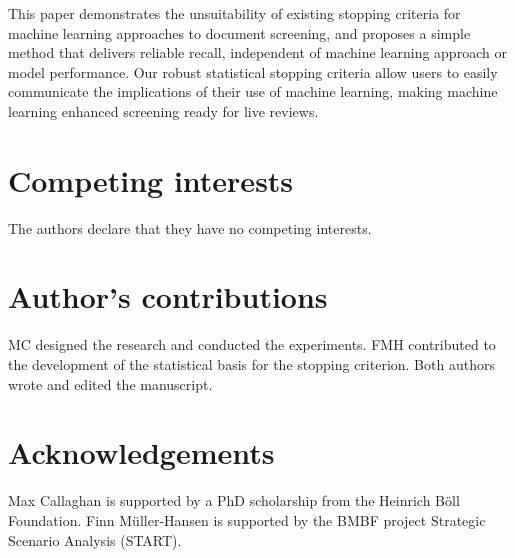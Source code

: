 \documentclass{bmcart}
\begin{document}
	This paper demonstrates the unsuitability of existing stopping criteria for machine learning approaches to document screening, and proposes a simple method that delivers reliable recall, independent of machine learning approach or model performance. Our robust statistical stopping criteria allow users to easily communicate the implications of their use of machine learning, making machine learning enhanced screening ready for live reviews.
	
	
\begin{backmatter}
	
	\section*{Competing interests}
	The authors declare that they have no competing interests.
	
	\section*{Author's contributions}
	MC designed the research and conducted the experiments. FMH contributed to the development of the statistical basis for the stopping criterion. Both authors wrote and edited the manuscript.
	
	\section*{Acknowledgements}
	Max Callaghan is supported by a PhD scholarship from the Heinrich Böll Foundation. Finn M\"{u}ller-Hansen is supported by the BMBF project Strategic Scenario Analysis (START).
		
	
	
	
\end{backmatter}
\end{document}
